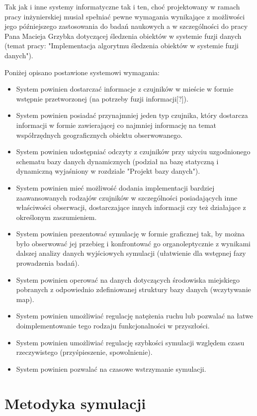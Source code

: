 \par{
Tak jak i inne systemy informatyczne tak i ten, choć projektowany w ramach pracy inżynierskiej musiał spełniać pewne wymagania wynikające z możliwości jego późniejszego zastosowania do badań naukowych a w szczególności do pracy Pana Macieja Grzybka dotyczącej śledzenia obiektów w systemie fuzji danych (temat pracy: "Implementacja algorytmu śledzenia obiektów w systemie fuzji danych").
}
\par{
Poniżej opisano postawione systemowi wymagania:
\begin{itemize}
	\item System powinien dostarczać informacje z czujników w mieście w formie wstępnie przetworzonej (na potrzeby fuzji informacji[?]).
	\item System powinien posiadać przynajmniej jeden typ czujnika, który dostarcza informacji w formie zawierającej co najmniej informację na temat współrzędnych geograficznych obiektu obserwowanego.
	\item System powinien udostępniać odczyty z czujników przy użyciu uzgodnionego schematu bazy danych dynamicznych (podział na bazę statyczną i dynamiczną wyjaśniony w rozdziale "Projekt bazy danych").
	\item System powinien mieć możliwość dodania implementacji bardziej zaawansowanych rodzajów czujników w szczególności posiadających inne właściwości obserwacji, dostarczające innych informacji czy też działające z określonym zaszumieniem.
	\item System powinien prezentować symulację w formie graficznej tak, by można było obserwować jej przebieg i konfrontować go organoleptycznie z wynikami dalszej analizy danych wyjściowych symulacji (ułatwienie dla wstępnej fazy prowadzenia badań).
	\item System powinien operować na danych dotyczących środowiska miejskiego pobranych z odpowiednio zdefiniowanej struktury bazy danych (wczytywanie map).
	\item System powinien umożliwiać regulację natężenia ruchu lub pozwalać na łatwe doimplementowanie tego rodzaju funkcjonalności w przyszłości.
	\item System powinien umożliwiać regulację szybkości symulacji względem czasu rzeczywistego (przyśpieszenie, spowolnienie).
	\item System powinien pozwalać na czasowe wstrzymanie symulacji.
\end{itemize}
}

\section[Metodyka symulacji][Metodyka symulacji]{Metodyka symulacji}
